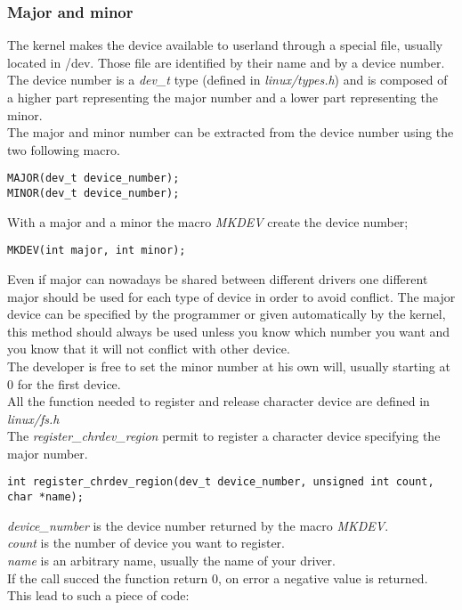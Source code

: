 \documentclass[11pt]{report}
\begin{document}
\subsubsection{Major and minor}
The kernel makes the device available to userland through a special file,
usually located in /dev. Those file are identified by their name and by a
device number. The device number is a {\it dev\_t} type (defined in
{\it linux/types.h}) and is composed of a higher part representing the major
number and a lower part representing the minor.\\
The major and minor number can be extracted from the device number using the
two following macro.
\begin{lstlisting}
MAJOR(dev_t device_number);
MINOR(dev_t device_number);
\end{lstlisting}
With a major and a minor the macro {\it MKDEV} create the device number;
\begin{lstlisting}
MKDEV(int major, int minor);
\end{lstlisting}
Even if major can nowadays be shared between different drivers
one different major should be used for each type of device in order to avoid
conflict. The major device can be specified by the programmer or given automatically
by the kernel, this method should always be used unless you know which number
you want and you know that it will not conflict with other device.\\
The developer is free to set the minor number at his own
will, usually starting at 0 for the first device.\\
All the function needed to register and release character device are defined in {\it
linux/fs.h}\\
The {\it register\_chrdev\_region} permit to register a character device specifying the
major number.
\begin{lstlisting}
int register_chrdev_region(dev_t device_number, unsigned int count, char *name);
\end{lstlisting}
{\it device\_number} is the device number returned by the macro {\it MKDEV}.\\
{\it count} is the number of device you want to register.\\
{\it name} is an arbitrary name, usually the name of your driver.\\
If the call succed the function return 0, on error a negative value is returned.\\
This lead to such a piece of code:
\end{document}
